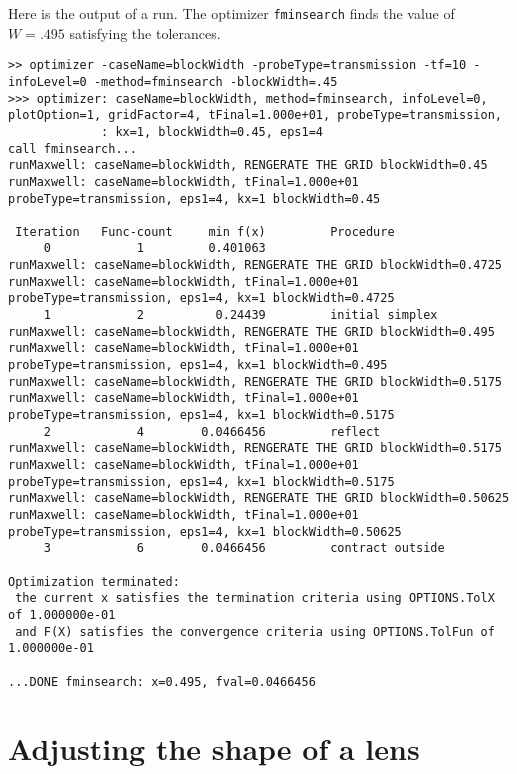 \documentclass[11pt]{article}
\begin{document}
\medskip\noindent
Here is the output of a run. The optimizer {\tt fminsearch} finds the value of $W=.495$ satisfying the
tolerances. 

\begin{lstlisting}[frame=single,caption={blockWidth}]
>> optimizer -caseName=blockWidth -probeType=transmission -tf=10 -infoLevel=0 -method=fminsearch -blockWidth=.45
>>> optimizer: caseName=blockWidth, method=fminsearch, infoLevel=0, plotOption=1, gridFactor=4, tFinal=1.000e+01, probeType=transmission, 
             : kx=1, blockWidth=0.45, eps1=4
call fminsearch...
runMaxwell: caseName=blockWidth, RENGERATE THE GRID blockWidth=0.45
runMaxwell: caseName=blockWidth, tFinal=1.000e+01 probeType=transmission, eps1=4, kx=1 blockWidth=0.45 
 
 Iteration   Func-count     min f(x)         Procedure
     0            1         0.401063         
runMaxwell: caseName=blockWidth, RENGERATE THE GRID blockWidth=0.4725
runMaxwell: caseName=blockWidth, tFinal=1.000e+01 probeType=transmission, eps1=4, kx=1 blockWidth=0.4725 
     1            2          0.24439         initial simplex
runMaxwell: caseName=blockWidth, RENGERATE THE GRID blockWidth=0.495
runMaxwell: caseName=blockWidth, tFinal=1.000e+01 probeType=transmission, eps1=4, kx=1 blockWidth=0.495 
runMaxwell: caseName=blockWidth, RENGERATE THE GRID blockWidth=0.5175
runMaxwell: caseName=blockWidth, tFinal=1.000e+01 probeType=transmission, eps1=4, kx=1 blockWidth=0.5175 
     2            4        0.0466456         reflect
runMaxwell: caseName=blockWidth, RENGERATE THE GRID blockWidth=0.5175
runMaxwell: caseName=blockWidth, tFinal=1.000e+01 probeType=transmission, eps1=4, kx=1 blockWidth=0.5175 
runMaxwell: caseName=blockWidth, RENGERATE THE GRID blockWidth=0.50625
runMaxwell: caseName=blockWidth, tFinal=1.000e+01 probeType=transmission, eps1=4, kx=1 blockWidth=0.50625 
     3            6        0.0466456         contract outside
 
Optimization terminated:
 the current x satisfies the termination criteria using OPTIONS.TolX of 1.000000e-01 
 and F(X) satisfies the convergence criteria using OPTIONS.TolFun of 1.000000e-01 

...DONE fminsearch: x=0.495, fval=0.0466456
\end{lstlisting}



\clearpage
\section{Adjusting the shape of a lens} \label{sec:optimizeLens}
\end{document}
